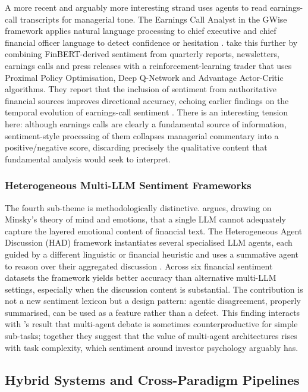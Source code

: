 A more recent and arguably more interesting strand uses agents to
read earnings-call transcripts for managerial tone. The Earnings Call
Analyst in the GWise framework applies natural language processing
to chief executive and chief financial officer language to detect
confidence or hesitation \citep{rezaei2025gwise}.
\citet{bharadwaj2025} take this further by combining FinBERT-derived
sentiment from quarterly reports, newsletters, earnings calls and
press releases with a reinforcement-learning trader that uses
Proximal Policy Optimisation, Deep Q-Network and Advantage
Actor-Critic algorithms. They report that the inclusion of sentiment
from authoritative financial sources improves directional accuracy,
echoing earlier findings on the temporal evolution of earnings-call
sentiment \citep{bharadwaj2025}. There is an interesting tension
here: although earnings calls are clearly a fundamental source of
information, sentiment-style processing of them collapses managerial
commentary into a positive/negative score, discarding precisely the
qualitative content that fundamental analysis would seek to
interpret.

\subsubsection{Heterogeneous Multi-LLM Sentiment Frameworks}
\label{sec:hadsentiment}

The fourth sub-theme is methodologically distinctive.
\citet{xing2025had} argues, drawing on Minsky's theory of mind and
emotions, that a single LLM cannot adequately capture the layered
emotional content of financial text. The Heterogeneous Agent
Discussion (HAD) framework instantiates several specialised LLM
agents, each guided by a different linguistic or financial
heuristic and uses a summative agent to reason over their
aggregated discussion \citep{xing2025had}. Across six financial
sentiment datasets the framework yields better accuracy than
alternative multi-LLM settings, especially when the discussion
content is substantial. The contribution is not a new sentiment
lexicon but a design pattern: agentic disagreement, properly
summarised, can be used as a feature rather than a defect. This
finding interacts with \citeauthor{han2024}'s \citeyearpar{han2024}
result that multi-agent debate is sometimes counterproductive for
simple sub-tasks; together they suggest that the value of
multi-agent architectures rises with task complexity, which sentiment
around investor psychology arguably has.

\subsection{Hybrid Systems and Cross-Paradigm Pipelines}
\label{sec:hybrid}

